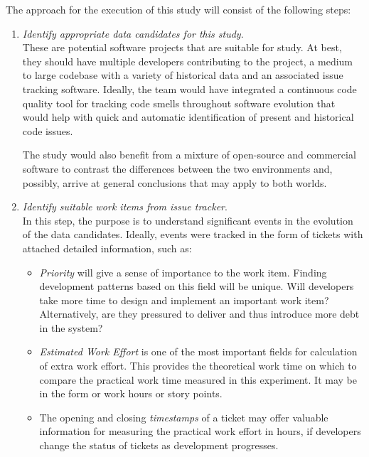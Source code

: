 \documentclass{mprop}
\begin{document}
The approach for the execution of this study will consist of the following
steps:
\begin{enumerate}
	\item \textit{Identify appropriate data candidates for this study}.\\
	      These are potential software projects that are suitable for study. At
	      best, they should have multiple developers contributing to the
	      project, a medium to large codebase with a variety of historical data
	      and an associated issue tracking software. Ideally, the team would
	      have integrated a continuous code quality tool for tracking code
	      smells throughout software evolution that would help with quick and
	      automatic identification of present and historical code issues.

	      The study would also benefit from a mixture of open-source and
	      commercial software to contrast the differences between the two
	      environments and, possibly, arrive at general conclusions that may
	      apply to both worlds.

	\item \textit{Identify suitable work items from issue tracker}.\\
	      In this step, the purpose is to understand significant events in the
	      evolution of the data candidates. Ideally, events were tracked in the
	      form of tickets with attached detailed information, such as:
	      \begin{itemize}
		      \item \textit{Priority} will give a sense of importance to the work item.
		            Finding development patterns based on this field will be unique.
		            Will developers take more time to design and implement an
		            important work item? Alternatively, are they pressured to deliver
		            and thus introduce more debt in the system?
		      \item \textit{Estimated Work Effort} is one of the most important
		            fields for calculation of extra work effort. This provides the
		            theoretical work time on which to compare the practical work time
		            measured in this experiment. It may be in the form or work hours
		            or story points.
		      \item The opening and closing \textit{timestamps} of a ticket may
		            offer valuable information for measuring the practical work effort
		            in hours, if developers change the status of tickets as
		            development progresses.
	      \end{itemize}


\end{enumerate}
\end{document}
